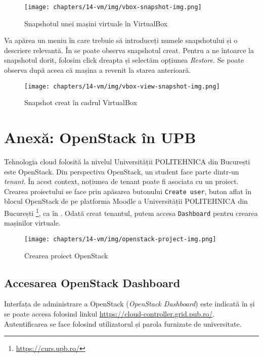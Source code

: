 \begin{figure}[!htbp]
	\centering
	\texttt{[image: chapters/14-vm/img/vbox-snapshot-img.png]}
	\caption{Snapshotul unei mașini virtuale în VirtualBox}
	\label{fig:vm:vbox-snapshot}
\end{figure}

Va apărea un meniu în care trebuie să introduceți numele snapshotului și o
descriere relevantă. În  se
poate observa snapshotul creat. Pentru a ne întoarce la snapshotul dorit,
folosim click dreapta și selectăm opțiunea \textit{Restore}.
Se poate observa după aceea că mașina a revenit la starea anterioară.

\begin{figure}[!htbp]
	\centering
	\texttt{[image: chapters/14-vm/img/vbox-view-snapshot-img.png]}
	\caption{Snapshot creat în cadrul VirtualBox}
	\label{fig:vm:vbox-view-snapshot}
\end{figure}

\section{Anexă: OpenStack în UPB}
\label{sec:vm:upb-openstack}

Tehnologia cloud folosită la nivelul Universității POLITEHNICA din București este OpenStack.
Din perspectiva OpenStack, un student face parte dintr-un \textit{tenant}.
În acest context, noțiunea de tenant poate fi asociata cu un
proiect. Crearea proiectului se face prin apăsarea butonului \texttt{Create user}, buton
aflat în blocul OpenStack de pe platforma Moodle a Universității POLITEHNICA din București
\footnote{\url{https://curs.upb.ro/}}, ca în . Odată
creat tenantul, putem accesa \texttt{Dashboard} pentru crearea mașinilor virtuale.

\begin{figure}[!htbp]
	\centering
	\texttt{[image: chapters/14-vm/img/openstack-project-img.png]}
	\caption{Crearea proiect OpenStack}
	\label{fig:vm:openstack-project}
\end{figure}

\subsection{Accesarea OpenStack Dashboard}
\label{sec:vm:upb-openstack:dashboard}

Interfața de administrare a OpenStack (\textit{OpenStack Dashboard}) este indicată în  și se poate accesa
folosind linkul \url{https://cloud-controller.grid.pub.ro/}. Autentificarea se face
folosind utilizatorul și parola furnizate de universitate.

